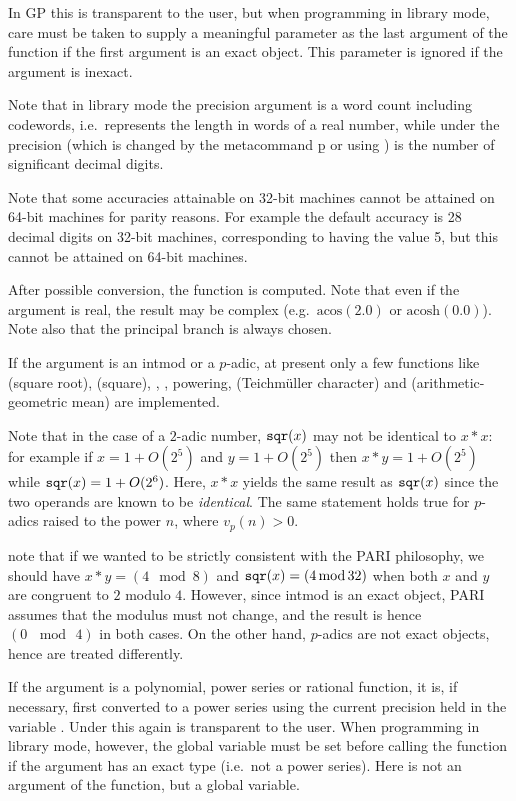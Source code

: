 In GP this is transparent to the user, but when programming in library
mode, care must be taken to supply a meaningful parameter  as the
last argument of the function if the first argument is an exact object.
This parameter is ignored if the argument is inexact.

   Note that in library mode the precision argument  is a word
count including codewords, i.e.~represents the length in words of a real
number, while under  the precision (which is changed by the metacommand
\b{p} or using ) is the number of significant
decimal digits.

Note that some accuracies attainable on 32-bit machines cannot be attained
on 64-bit machines for parity reasons. For example the default  accuracy
is 28 decimal digits on 32-bit machines, corresponding to  having
the value 5, but this cannot be attained on 64-bit machines.\smallskip

After possible conversion, the function is computed. Note that even if the
argument is real, the result may be complex (e.g.~$\text{acos}(2.0)$ or
$\text{acosh}(0.0)$). Note also that the principal branch is always chosen.

\item If the argument is an intmod or a $p$-adic, at present only a
few functions like  (square root),  (square), ,
, powering,  (Teichm\"uller character) and
 (arithmetic-geometric mean) are implemented.

Note that in the case of a $2$-adic number, ${\tt sqr}(x)$ may not be
identical to $x*x$: for example if $x = 1+O(2^5)$ and $y = 1+O(2^5)$ then
$x*y = 1+O(2^5)$ while ${\tt sqr}(x) = 1+O(2^6)$. Here, $x * x$ yields the
same result as ${\tt sqr}(x)$ since the two operands are known to be
\emph{identical}. The same statement holds true for $p$-adics raised to the
power $n$, where $v_p(n) > 0$.

 note that if we wanted to be strictly consistent with
the PARI philosophy, we should have $x*y = (4 \mod 8)$ and ${\tt sqr}(x) =
(4 \,{\rm mod}\, 32)$ when both $x$ and $y$ are congruent to $2$ modulo $4$.
However, since intmod is an exact object, PARI assumes that the modulus
must not change, and the result is hence $(0\, \mod\, 4)$ in both cases. On
the other hand, $p$-adics are not exact objects, hence are treated
differently.

\item If the argument is a polynomial, power series or rational function,
it is, if necessary, first converted to a power series using the current
precision held in the variable . Under  this again is
transparent to the user. When programming in library mode, however, the
global variable  must be set before calling the function if the
argument has an exact type (i.e.~not a power series). Here  is
not an argument of the function, but a global variable.

